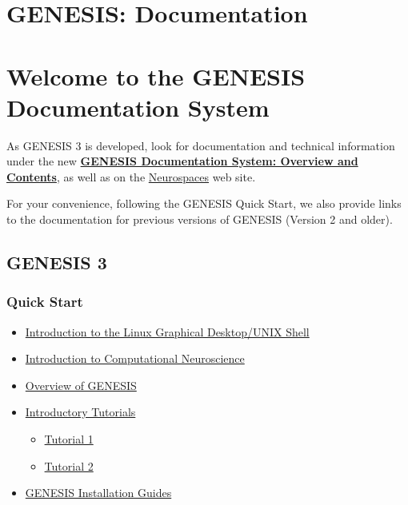 \documentclass[12pt]{article}
\begin{document}
\section*{GENESIS: Documentation}

\section*{Welcome to the GENESIS Documentation System}

As GENESIS 3 is developed, look for documentation and technical information under the new \href{../documentation-overview/documentation-overview.tex}{\bf GENESIS Documentation System: Overview and Contents}, as well as on the \href{http://www.neurospaces.org}{Neurospaces} web site.

For your convenience, following the GENESIS Quick Start, we also provide links to the documentation for previous versions of GENESIS (Version 2 and older).

\subsection*{GENESIS 3}

\subsubsection*{Quick Start}

\begin{itemize}

\item \href{../unix-linux/unix-linux.tex}{Introduction to the Linux Graphical Desktop/UNIX Shell}

\item \href{../compneurosci-1/compneurosci-1.tex}{Introduction to Computational Neuroscience}

\item \href{../genesis-overview/genesis-overview.tex}{Overview of GENESIS}

\item \href{../contents-level1/contents-level1.tex}{Introductory Tutorials}
  \begin{itemize}
  \item \href{../tutorial1/tutorial1.tex}{Tutorial 1}

  \item \href{../tutorial2/tutorial2.tex}{Tutorial 2}
  \end{itemize}

\item \href{../installation/installation.tex}{GENESIS Installation Guides}

\end{itemize}
\end{document}
